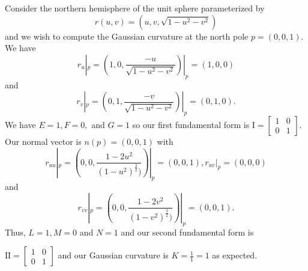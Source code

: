 \begin{example}\label{ex:compute-surface-curvature}
Consider the northern hemisphere of the unit sphere parameterized
by $$r(u,v)=(u,v,\sqrt{1-u^2-v^2})$$ and we wish to compute the Gaussian curvature at
the north pole $p=(0,0,1)$.
We have $$r_u|_p=(1,0,\frac{-u}{\sqrt{1-u^2-v^2}})|_p=(1,0,0)$$ and
$$r_v|_p=(0,1,\frac{-v}{\sqrt{1-u^2-v^2}})|_p=(0,1,0).$$
We have $E=1, F=0,$ and $G=1$ so our first fundamental form is
$\mathrm{I}=\begin{bmatrix}
1 & 0 \\
0 & 1 
\end{bmatrix}.$
Our normal vector is $n(p)=(0,0,1)$ with 
$$r_{uu}|_p=(0,0,\frac{1-2u^2}{(1-u^2)^{\frac{3}{2}})})|_p=(0,0,1),
r_{uv}|_p=(0,0,0)$$ and 
$$r_{vv}|_p=(0,0,\frac{1-2v^2}{(1-v^2)^{\frac{3}{2}})})|_p=(0,0,1).$$
Thus, $L=1, M=0$ and $N=1$ and our second fundamental form is

$\mathrm{I\!I}=\begin{bmatrix}
1 & 0 \\
0 & 1 
\end{bmatrix}$
and our Gaussian curvature is $K=\frac{1}{1}=1$ as expected.

\end{example}


